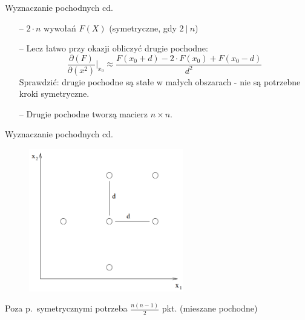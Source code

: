   \begin{frame}{Wyznaczanie pochodnych cd.}

    \begin{block}{}
      \begin{itemize}
 	      \item[--] $2 \cdot n$ wywołań $F(X)$ (symetryczne, gdy $2\ |\ n$)
 	      \item[--] Lecz łatwo przy okazji obliczyć drugie pochodne:
 	  	  \begin{displaymath}
 	   	  	\frac{\partial (F)}{\partial (x^2)} \bigg\vert_{x_0} \approx \frac{F(x_0+d) - 2 \cdot F(x_0) + F(x_0-d)}{d^2}
 	      \end{displaymath}
 	      Sprawdzić: drugie pochodne są stałe w małych obszarach - nie są potrzebne kroki symetryczne.
 	      \item[--] Drugie pochodne tworzą macierz $n \times n$.
      \end{itemize}
  	\end{block}

  \end{frame}

  \begin{frame}{Wyznaczanie pochodnych cd.}

    \begin{figure}
		\centering
		\includegraphics[height=0.6\textheight ,width=0.6\textwidth]{img/17/wyznaczanie_pochodnych}
	\end{figure}
    \begin{block}{}
      Poza p.~symetrycznymi potrzeba $\frac{n(n-1)}{2}$ pkt. (mieszane pochodne)
  	\end{block}

  \end{frame}

